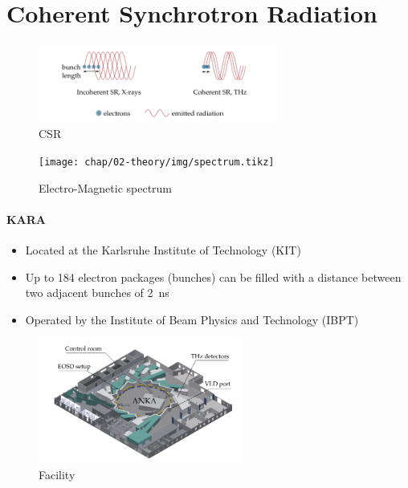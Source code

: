\section{Coherent Synchrotron Radiation}


\begin{figure}[H]
	\centering
	\includegraphics[width = 0.7\textwidth]{chap/02-theory/img/csr2.png}
	\caption{CSR \cite{rota2018}}
	\label{fig:csr}
\end{figure}



\begin{figure}[H]
	\centering
	\texttt{[image: chap/02-theory/img/spectrum.tikz]}
	\caption{Electro-Magnetic spectrum}
	\label{fig:spectrum}
\end{figure}





\paragraph{KARA}
\begin{itemize}
	\item Located at the Karlsruhe Institute of Technology (KIT)
	\item Up to 184 electron packages (bunches) can be filled with a distance between two adjacent bunches of \SI{2}{\nano \second}
	\item Operated by the Institute of Beam Physics and Technology (IBPT)
\end{itemize}

\begin{figure}[H]
	\centering
	\includegraphics[width = 0.6\textwidth]{chap/02-theory/img/kara.png}
	\caption{Facility \cite{rota2018}}
	\label{fig:kara}
\end{figure}

